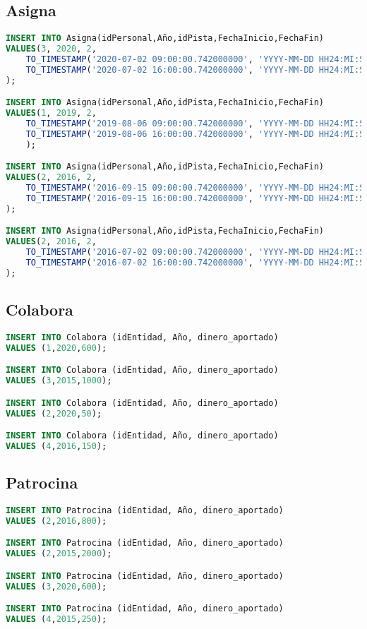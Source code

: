 \subsection{Asigna}
\begin{lstlisting}[language=sql]
INSERT INTO Asigna(idPersonal,Año,idPista,FechaInicio,FechaFin)
VALUES(3, 2020, 2,
	TO_TIMESTAMP('2020-07-02 09:00:00.742000000', 'YYYY-MM-DD HH24:MI:SS.FF'),
	TO_TIMESTAMP('2020-07-02 16:00:00.742000000', 'YYYY-MM-DD HH24:MI:SS.FF')
);

INSERT INTO Asigna(idPersonal,Año,idPista,FechaInicio,FechaFin)
VALUES(1, 2019, 2,
	TO_TIMESTAMP('2019-08-06 09:00:00.742000000', 'YYYY-MM-DD HH24:MI:SS.FF'),
	TO_TIMESTAMP('2019-08-06 16:00:00.742000000', 'YYYY-MM-DD HH24:MI:SS.FF')
	);

INSERT INTO Asigna(idPersonal,Año,idPista,FechaInicio,FechaFin)
VALUES(2, 2016, 2,
	TO_TIMESTAMP('2016-09-15 09:00:00.742000000', 'YYYY-MM-DD HH24:MI:SS.FF'),
	TO_TIMESTAMP('2016-09-15 16:00:00.742000000', 'YYYY-MM-DD HH24:MI:SS.FF')
);

INSERT INTO Asigna(idPersonal,Año,idPista,FechaInicio,FechaFin)
VALUES(2, 2016, 2,
	TO_TIMESTAMP('2016-07-02 09:00:00.742000000', 'YYYY-MM-DD HH24:MI:SS.FF'),
	TO_TIMESTAMP('2016-07-02 16:00:00.742000000', 'YYYY-MM-DD HH24:MI:SS.FF')
);
\end{lstlisting}

\pagebreak

\subsection{Colabora}
\begin{lstlisting}[language=sql]
INSERT INTO Colabora (idEntidad, Año, dinero_aportado)
VALUES (1,2020,600);

INSERT INTO Colabora (idEntidad, Año, dinero_aportado)
VALUES (3,2015,1000);

INSERT INTO Colabora (idEntidad, Año, dinero_aportado)
VALUES (2,2020,50);

INSERT INTO Colabora (idEntidad, Año, dinero_aportado)
VALUES (4,2016,150);
\end{lstlisting}

\subsection{Patrocina}
\begin{lstlisting}[language=sql]
INSERT INTO Patrocina (idEntidad, Año, dinero_aportado)
VALUES (2,2016,800);

INSERT INTO Patrocina (idEntidad, Año, dinero_aportado)
VALUES (2,2015,2000);

INSERT INTO Patrocina (idEntidad, Año, dinero_aportado)
VALUES (3,2020,600);

INSERT INTO Patrocina (idEntidad, Año, dinero_aportado)
VALUES (4,2015,250);
\end{lstlisting}

